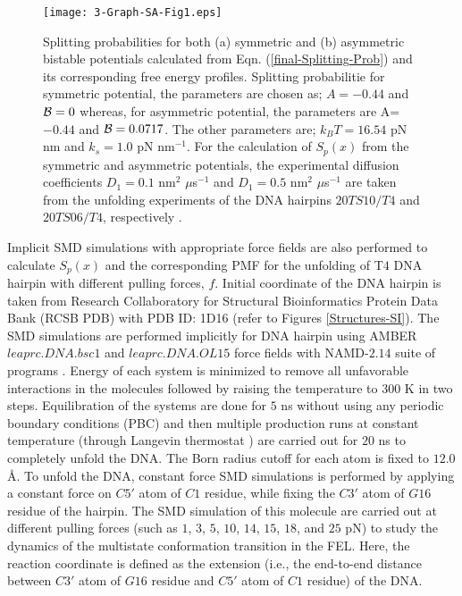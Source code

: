\documentclass[twoside,twocolumn,9pt]{article}
\begin{document}
\begin{figure}[t!]
\texttt{[image: 3-Graph-SA-Fig1.eps]}
\caption{Splitting probabilities for both (a) symmetric and (b) asymmetric bistable potentials
calculated from Eqn. (\ref{final-Splitting-Prob}) and its corresponding free energy profiles.
Splitting probabilitie for symmetric potential, the parameters are chosen as; $A=-0.44$ and ${\cal{B}}=0$
whereas, for asymmetric potential, the parameters are A=$-0.44$ and ${\cal{B}}=0.0717$. The other parameters 
are; $k_{B}T=16.54$ pN nm and $k_{s}=1.0$ pN nm$^{-1}$. For the calculation of $S_{p}(x)$ from the 
symmetric and asymmetric potentials, the experimental diffusion coefficients $D_{1}=0.1$ nm${}^{2}$ $\mu$s${}^{-1}$ and 
$D_{1}=0.5$ nm$^{2}$ $\mu$s$^{-1}$ are taken from the unfolding experiments of the DNA hairpins $20TS10/T4$ and 
$20TS06/T4$, respectively \cite{neupane2012transition}.} 
\label{Splitting-Theory-Exp}
\end{figure}

Implicit SMD simulations with appropriate force fields are also performed to calculate $S_{p}(x)$ and the corresponding
PMF for the unfolding of T$4$ DNA hairpin with different pulling forces, $f$. Initial coordinate of the DNA hairpin is 
taken from Research Collaboratory for Structural Bioinformatics Protein Data Bank (RCSB PDB) with PDB ID: 
1D16 (refer to Figures {\ref{Structures-SI}}).
The SMD simulations are performed implicitly for DNA hairpin using AMBER $leaprc.DNA.bsc1$ and $leaprc.DNA.OL15$
force fields \cite{galindo2016assessing} with NAMD-$2.14$ suite of programs \cite{phillips2005scalable}.
Energy of each system is minimized to remove all unfavorable interactions in the molecules followed by raising 
the temperature to $300$ K in two steps. Equilibration of the systems are done for $5$ ns without using any periodic 
boundary conditions (PBC) and then multiple production runs at constant temperature (through Langevin thermostat 
\cite{van1988leap}) are carried out for $20$ ns to completely unfold the DNA. The Born radius cutoff 
for each atom is fixed to $12.0$ \AA. To unfold the DNA, constant force SMD simulations is performed by applying a 
constant force on $C5'$ atom of $C1$ residue, while fixing the $C3'$ atom of $G16$ residue of the hairpin. 
The SMD simulation of this molecule are carried out at different pulling forces (such as $1$, $3$, $5$, $10$, $14$, $15$, $18$, 
and $25$ pN) to study the dynamics of the multistate conformation transition in the FEL. 
Here, the reaction coordinate is defined as the extension (i.e., the end-to-end distance between $C3'$ atom of $G16$ 
residue and $C5'$ atom of $C1$ residue) of the DNA.
\end{document}
